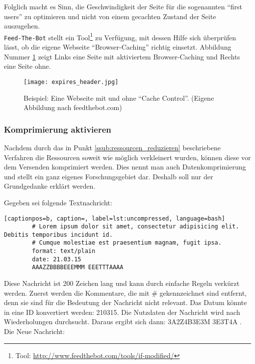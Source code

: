 				Folglich macht es Sinn, die Geschwindigkeit der Seite für die sogenannten "`first users"' zu optimieren und nicht von einem gecachten Zustand der Seite auszugehen.\\
				\texttt{Feed-The-Bot} stellt ein Tool\footnote{Tool: \url{http://www.feedthebot.com/tools/if-modified/}} zu Verfügung, mit dessen Hilfe sich überprüfen lässt, ob die eigene Webseite "`Browser-Caching"' richtig einsetzt. Abbildung Nummer \ref{fig:expires_header} zeigt Links eine Seite mit aktiviertem Browser-Caching und Rechts eine Seite ohne.
			  \begin{figure}[htbp]
			  	\begin{center}
			  		\texttt{[image: expires\_header.jpg]}
			  		\caption{Beispiel: Eine Webseite mit und ohne "`Cache Control"'. (Eigene Abbildung nach feedthebot.com)}
			  		\label{fig:expires_header}
			  	\end{center}
			  \end{figure}
			\pagebreak

			\subsubsection{Komprimierung aktivieren} %
			\label{ssub:komprimierung_aktivieren}
				Nachdem durch das in Punkt \ref{ssub:ressourcen_reduzieren} beschriebene Verfahren die Ressourcen soweit wie möglich verkleinert wurden, können diese vor dem Versenden komprimiert werden. Dies nennt man auch Datenkomprimierung und stellt ein ganz eigenes Forschungsgebiet dar. Deshalb soll nur der Grundgedanke erklärt werden.

				Gegeben sei folgende Textnachricht:
				\begin{lstlisting}[captionpos=b, caption=, label=lst:uncompressed, language=bash]
		# Lorem ipsum dolor sit amet, consectetur adipisicing elit. Debitis temporibus incidunt id.
		# Cumque molestiae est praesentium magnam, fugit ipsa.
		format: text/plain
		date: 21.03.15
		AAAZZBBBBEEEMMM EEETTTAAAA
				\end{lstlisting}

				Diese Nachricht ist 200 Zeichen lang und kann durch einfache Regeln verkürzt werden. Zuerst werden die Kommentare, die mit \# gekennzeichnet sind entfernt, denn sie sind für die Bedeutung der Nachricht nicht relevant. Das Datum könnte in eine ID konvertiert werden: 210315. Die Nutzdaten der Nachricht wird nach Wiederholungen durchsucht. Daraus ergibt sich dann: 3A2Z4B3E3M 3E3T4A \autocite{grigorikGzip}. Die Neue Nachricht:

